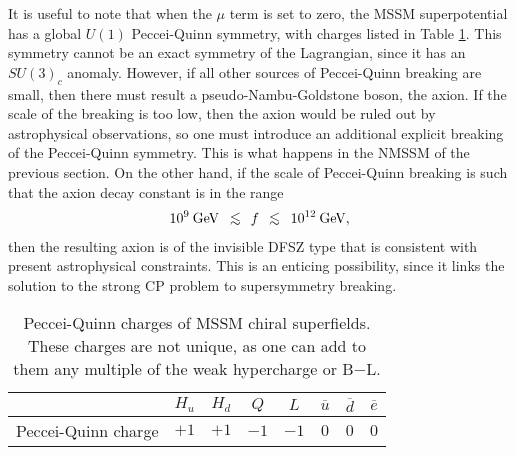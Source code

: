 \documentclass[11pt]{article}
\def\beq{\begin{eqnarray}}
\def\eeq{\end{eqnarray}}
\def\centeron#1#2{{\setbox0=\hbox{#1}\setbox1=\hbox{#2}\ifdim
\wd1>\wd0\kern.5\wd1\kern-.5\wd0\fi
\copy0\kern-.5\wd0\kern-.5\wd1\copy1\ifdim\wd0>\wd1
\kern.5\wd0\kern-.5\wd1\fi}}
\def\ltap{\;\centeron{\raise.35ex\hbox{$<$}}{\lower.65ex\hbox{$\sim$}}\;}
\def\lsim{\mathrel{\ltap}}
\begin{document}
It is useful to note that when the $\mu$ term is set to zero,
the MSSM superpotential 
has a global $U(1)$ Peccei-Quinn symmetry, with charges listed in Table 
\ref{table:PecceiQuinn}. 
This symmetry cannot be an exact symmetry of the Lagrangian, since it has
an $SU(3)_c$ anomaly. However, if all other sources of Peccei-Quinn breaking
are small, then there must result a pseudo-Nambu-Goldstone boson, the axion.
If the scale of the breaking is too low, then the axion would be ruled
out by astrophysical observations, so one must introduce an additional
explicit breaking of the Peccei-Quinn symmetry. This is what happens in the
NMSSM of the previous section. 
On the other hand, if the scale of Peccei-Quinn breaking is
such that the axion decay constant
is in the range
\beq
10^{9}\>\mbox{GeV} \> \lsim \,f\, \lsim\> 10^{12}\>\mbox{GeV},
\label{eq:axionfrange}
\eeq
then the resulting axion is of the invisible DFSZ type \cite{DFSZ}
that is consistent with present astrophysical constraints. This is an
enticing possibility, since it links the solution to the strong CP problem to
supersymmetry breaking. 
\renewcommand{\arraystretch}{1.4}
\begin{table}[tb]
\begin{center}
%
\begin{tabular}{|c|c|c|c|c|c|c|c|}
\hline
& $H_u$ & $H_d$ & $Q$ & $L$ & $\overline u$ & $\overline d$ &
$\overline e$ \\
\hline Peccei-Quinn charge & $+1$ & $+1$ & $-1$ & $-1$ & $0$ & $0$ &
$0$ \\ \hline
\end{tabular}
%
\caption{Peccei-Quinn charges of MSSM chiral superfields.
These charges are not unique,
as one can add to them any multiple of the weak hypercharge or 
B$-$L.\label{table:PecceiQuinn}} 
\end{center}
\end{table}
\end{document}
